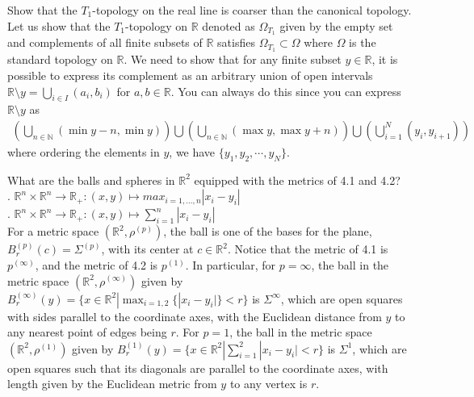 \documentclass[document]{article}
\begin{document}
\begin{problem}[3.11] Show that the $T_1$-topology on the real line is coarser than the canonical topology.\\


Let us show that the $T_1$-topology on $\mathbb{R}$ denoted as $\Omega_{T_1}$ given by the empty set and complements of all finite subsets of $\mathbb{R}$ satisfies $\Omega_{T_1} \subset \Omega$ where $\Omega$ is the standard topology on $\mathbb{R}$. We need to show that for any finite subset $y \in \mathbb{R}$, it is possible to express its complement as an arbitrary union of open intervals $\mathbb{R}\setminus y = \bigcup_{i\in I} (a_i,b_i)$ for $a,b \in \mathbb{R}$. You can always do this since you can express $\mathbb{R} \setminus y$ as
\begin{align}
    \left(\bigcup_{n\in \mathbb{N}} (\min{y}-n, \min{y}) \right)\bigcup \left(\bigcup_{n \in \mathbb{N}} (\max{y}, \max{y}+n) \right) \bigcup \left(\bigcup_{i=1}^{N} (y_i, y_{i+1}) \right)
\end{align}
where ordering the elements in $y$, we have $\{y_1, y_2, \cdots, y_N \}$.
\end{problem}

\begin{problem}[4.7] What are the balls and spheres in $\mathbb{R}^2$ equipped with the metrics of 4.1 and 4.2?\\
. $\mathbb{R}^n \times \mathbb{R}^n \rightarrow \mathbb{R}_+ : \left(x,y\right) \mapsto max_{i=1,...,n} \left| x_i - y_i\right|$\\
. $\mathbb{R}^n \times \mathbb{R}^n \rightarrow \mathbb{R}_+ : \left(x,y\right) \mapsto \sum_{i=1}^n \left| x_i - y_i\right|$\\


For a metric space $(\mathbb{R}^2,\rho^{(p)})$, the ball is one of the bases for the plane, $B_r^{(p)}(c)=\Sigma^{(p)}$, with its center at $c \in \mathbb{R}^2$. Notice that the metric of 4.1 is $p^{(\infty)}$, and the metric of 4.2 is $p^{(1)}$. In particular, for $p=\infty$, the ball in the metric space $(\mathbb{R}^2, \rho^{(\infty)})$ given by $B_r^{(\infty)}(y) = \{ x \in \mathbb{R}^2 | \max_{i=1,2}\{|x_i-y_i|\} < r \}$ is $\Sigma^\infty$, which are open squares with sides parallel to the coordinate axes, with the Euclidean distance from $y$ to any nearest point of edges being $r$. For $p=1$, the ball in the metric space $(\mathbb{R}^2, \rho^{(1)})$ given by $B_r^{(1)}(y) = \{ x \in \mathbb{R}^2 | \sum_{i=1}^2 |x_i-y_i| < r \}$ is $\Sigma^1$, which are open squares such that its diagonals are parallel to the coordinate axes, with length given by the Euclidean metric from $y$ to any vertex is $r$.

\end{problem}
\end{document}
